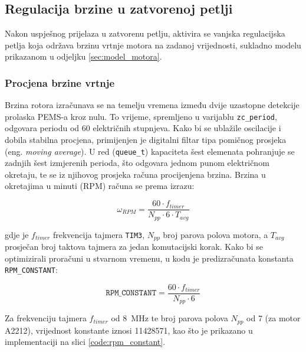 \documentclass[diplomskirad]{fer}
\begin{document}
\subsection{Regulacija brzine u zatvorenoj petlji}
\label{ssec:regulacija_brzine}

Nakon uspješnog prijelaza u zatvorenu petlju, aktivira se vanjska regulacijska
petlja koja održava brzinu vrtnje motora na zadanoj vrijednosti, sukladno
modelu prikazanom u odjeljku \ref{sec:model_motora}.

\subsubsection{Procjena brzine vrtnje}
\label{sssec:procjena_brzine}

Brzina rotora izračunava se na temelju vremena između dvije uzastopne detekcije
prolaska PEMS-a kroz nulu. To vrijeme, spremljeno u varijablu
\texttt{zc\_period}, odgovara periodu od 60 električnih stupnjeva. Kako bi se
ublažile oscilacije i dobila stabilna procjena, primijenjen je digitalni filtar
tipa pomičnog prosjeka (eng. \textit{moving average}). U red
(\texttt{queue\_t}) kapaciteta šest elemenata pohranjuje se zadnjih šest
izmjerenih perioda, što odgovara jednom punom električnom okretaju, te se iz
njihovog prosjeka računa procijenjena brzina. Brzina u okretajima u minuti
(RPM) računa se prema izrazu:

\begin{equation}
	\omega_{RPM} = \frac{60 \cdot f_{timer}}{N_{pp} \cdot 6 \cdot T_{avg}}
\end{equation}

gdje je $f_{timer}$ frekvencija tajmera \texttt{TIM3}, $N_{pp}$ broj parova
polova motora, a $T_{avg}$ prosječan broj taktova tajmera za jedan komutacijski
korak. Kako bi se optimizirali proračuni u stvarnom vremenu, u kodu je
predizračunata konstanta \texttt{RPM\_CONSTANT}:

\begin{equation}
	\texttt{RPM\_CONSTANT} = \frac{60 \cdot f_{timer}}{N_{pp} \cdot 6}
\end{equation}

Za frekvenciju tajmera $f_{timer}$ od \SI{8}{\mega\hertz} te broj parova polova
$N_{pp}$ od 7 (za motor A2212), vrijednost konstante iznosi 11428571, kao što
je prikazano u implementaciji na slici \ref{code:rpm_constant}.
\end{document}
